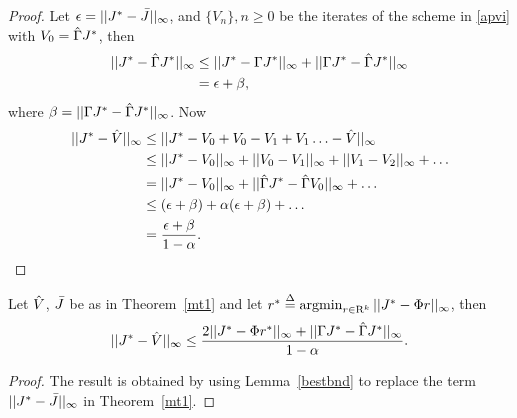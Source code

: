 \begin{proof}
Let $\epsilon=||J^*-\bar{J}||_\infty$, and $\{V_n\},n\geq 0$ be the iterates of the scheme in \eqref{apvi} with $V_0=\hat{\Gamma} J^*$, then
\begin{align}
||J^*-\hat{\Gamma} J^*||_\infty&\leq||J^*-\Gamma J^*||_\infty+||\Gamma J^*-\hat{\Gamma} J^*||_\infty\nonumber\\
&= \epsilon+\beta,
\end{align}
where $\beta=||\Gamma J^*-\hat{\Gamma} J^*||_\infty$. Now
\begin{align}
||J^*-\hat{V}||_\infty&\leq ||J^*-V_0+V_0-V_1+V_1\ldots-\hat{V}||_\infty\nonumber\\
&\leq ||J^*-V_0||_\infty+||V_0-V_1||_\infty+||V_1-V_2||_\infty+\ldots\nonumber\\
&=||J^*-V_0||_\infty+||\hat{\Gamma} J^*-\hat{\Gamma} V_0||_\infty+\ldots\nonumber\\
&\leq (\epsilon+\beta)+\alpha(\epsilon+\beta)+\ldots\nonumber\\
&=\frac{\epsilon+\beta}{1-\alpha}.
\end{align}
\end{proof}
\begin{corollary}\label{cmt1}
Let $\hat{V}$, $\bar{J}$ be as in Theorem~\ref{mt1} and let $r^*\stackrel{\Delta}{=}\operatorname{argmin}_{r\in \mathrm{R}^k}||J^*-\Phi r||_\infty$, then
\begin{align}
||J^*-\hat{V}||_\infty\leq \frac{2||J^*-\Phi r^*||_\infty+||\Gamma J^*-\hat{\Gamma} J^*||_\infty}{1-\alpha}.
\end{align}
\end{corollary}
\begin{proof}
The result is obtained by using Lemma~\ref{bestbnd} to replace the term $||J^*-\bar{J}||_\infty$ in Theorem~\ref{mt1}.
\end{proof}
